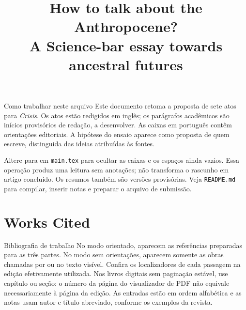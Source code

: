 \documentclass[12pt,a4paper]{article}
\title{How to talk about the Anthropocene?\\[0.35em]
  \large A Science-bar essay towards ancestral futures}
\author{} %
\date{}
\newif\iforientacoes
\begin{document}
\maketitle
\vspace{-2.5em}

\begin{orientacao}{Como trabalhar neste arquivo}
Este documento retoma a proposta de sete atos para \textit{Crisis}.
Os atos estão redigidos em inglês; os parágrafos acadêmicos são inícios
provisórios de redação, a desenvolver. As caixas em português contêm
orientações editoriais. A hipótese do ensaio aparece como proposta de quem
escreve, distinguida das ideias atribuídas às fontes.

Altere \texttt{\string\orientacoestrue} para
\texttt{\string\orientacoesfalse} em \texttt{main.tex} para ocultar as
caixas e os espaços ainda vazios. Essa operação produz uma leitura sem
anotações; não transforma o rascunho em artigo concluído. Os resumos
também são versões provisórias. Veja \texttt{README.md} para compilar,
inserir notas e preparar o arquivo de submissão.
\end{orientacao}






\clearpage
\section*{Works Cited}
\begin{orientacao}{Bibliografia de trabalho}
No modo orientado, aparecem as referências preparadas para as três partes.
No modo sem orientações, aparecem somente as obras chamadas por
\texttt{\string\fonte} ou \texttt{\string{}} no texto visível.
Confira os localizadores de cada passagem na edição efetivamente utilizada.
Nos livros digitais sem paginação estável, use capítulo ou seção: o número
da página do visualizador de PDF não equivale necessariamente à página da
edição. As entradas estão em ordem alfabética e as notas usam autor e
título abreviado, conforme os exemplos da revista.
\end{orientacao}
\imprimirreferencias
\end{document}
